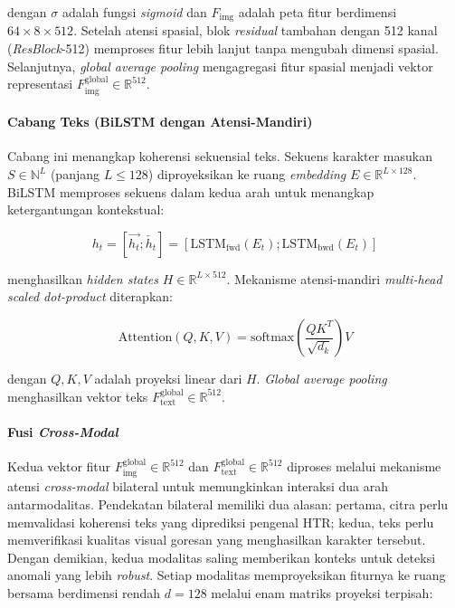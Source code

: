 \noindent dengan $\sigma$ adalah fungsi \textit{sigmoid} dan $F_{\text{img}}$ adalah peta fitur berdimensi $64 \times 8 \times 512$. Setelah atensi spasial, blok \textit{residual} tambahan dengan 512 kanal (\textit{ResBlock}-512) memproses fitur lebih lanjut tanpa mengubah dimensi spasial. Selanjutnya, \textit{global average pooling} mengagregasi fitur spasial menjadi vektor representasi $F_{\text{img}}^{\text{global}} \in \mathbb{R}^{512}$.

\paragraph{Cabang Teks (BiLSTM dengan Atensi-Mandiri)}

Cabang ini menangkap koherensi sekuensial teks. Sekuens karakter masukan $S \in \mathbb{N}^{L}$ (panjang $L \leq 128$) diproyeksikan ke ruang \textit{embedding} $E \in \mathbb{R}^{L \times 128}$. BiLSTM memproses sekuens dalam kedua arah untuk menangkap ketergantungan kontekstual:

\begin{equation}
  h_t = [\overrightarrow{h_t}; \overleftarrow{h_t}] = [\text{LSTM}_{\text{fwd}}(E_t); \text{LSTM}_{\text{bwd}}(E_t)]
  \label{eq:IV.6}
\end{equation}

\noindent menghasilkan \textit{hidden states} $H \in \mathbb{R}^{L \times 512}$. Mekanisme atensi-mandiri \textit{multi-head scaled dot-product} diterapkan:

\begin{equation}
  \text{Attention}(Q, K, V) = \text{softmax}\left(\frac{QK^T}{\sqrt{d_k}}\right)V
  \label{eq:IV.7}
\end{equation}

\noindent dengan $Q, K, V$ adalah proyeksi linear dari $H$. \textit{Global average pooling} menghasilkan vektor teks $F_{\text{text}}^{\text{global}} \in \mathbb{R}^{512}$.

\paragraph{Fusi \textit{Cross-Modal}}

Kedua vektor fitur $F_{\text{img}}^{\text{global}} \in \mathbb{R}^{512}$ dan $F_{\text{text}}^{\text{global}} \in \mathbb{R}^{512}$ diproses melalui mekanisme atensi \textit{cross-modal} bilateral untuk memungkinkan interaksi dua arah antarmodalitas. Pendekatan bilateral memiliki dua alasan: pertama, citra perlu memvalidasi koherensi teks yang diprediksi pengenal HTR; kedua, teks perlu memverifikasi kualitas visual goresan yang menghasilkan karakter tersebut. Dengan demikian, kedua modalitas saling memberikan konteks untuk deteksi anomali yang lebih \textit{robust}. Setiap modalitas memproyeksikan fiturnya ke ruang bersama berdimensi rendah $d=128$ melalui enam matriks proyeksi terpisah:

